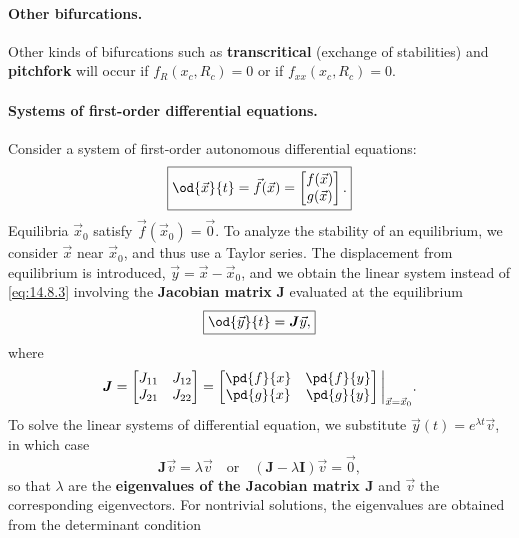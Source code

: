\paragraph{Other bifurcations.}
Other kinds of bifurcations such as \textbf{transcritical} (exchange of stabilities) and \textbf{pitchfork} will occur if $f_R(x_c, R_c) = 0$ or if $f_{xx}(x_c, R_c) = 0$.

\paragraph{Systems of first-order differential equations.}
Consider a system of first-order autonomous differential equations:
\begin{equation}
\boxed{\od{\vec{x}}{t} = \vec{f}(\vec{x}) = \begin{bmatrix} f(\vec{x}) \\ g(\vec{x}) \end{bmatrix}.}
\label{eq:14.8.11}
\end{equation}
Equilibria $\vec{x}_0$ satisfy $\vec{f}(\vec{x}_0) = \vec{0}$. To analyze the stability of an equilibrium, we consider $\vec{x}$ near $\vec{x}_0$, and thus use a Taylor series. The displacement from equilibrium is introduced, $\vec{y} = \vec{x} - \vec{x}_0$, and we obtain the linear system instead of \eqref{eq:14.8.3} involving the \textbf{Jacobian matrix} $\boldsymbol{J}$ evaluated at the equilibrium
\begin{equation}
\boxed{\od{\vec{y}}{t} = \boldsymbol{J}\vec{y},}
\label{eq:14.8.12}
\end{equation}
where
\begin{equation}
\boldsymbol{J} = \begin{bmatrix} J_{11} & J_{12} \\ J_{21} & J_{22} \end{bmatrix} = \begin{bmatrix} \pd{f}{x} & \pd{f}{y} \\ \pd{g}{x} & \pd{g}{y} \end{bmatrix}\bigg|_{\vec{x}=\vec{x}_0}.
\label{eq:14.8.13}
\end{equation}
To solve the linear systems of differential equation, we substitute $\vec{y}(t) = e^{\lambda t}\vec{v}$, in which case
\begin{equation}
\boxed{\boldsymbol{J}\vec{v} = \lambda\vec{v} \quad \text{or} \quad (\boldsymbol{J} - \lambda \boldsymbol{I})\vec{v} = \vec{0},}
\label{eq:14.8.14}
\end{equation}
so that $\lambda$ are the \textbf{eigenvalues of the Jacobian matrix $\boldsymbol{J}$} and $\vec{v}$ the corresponding eigenvectors. For nontrivial solutions, the eigenvalues are obtained from the determinant condition
